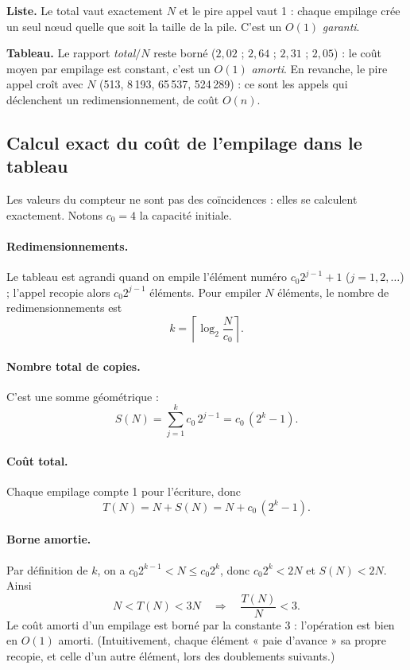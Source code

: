 \documentclass[11pt,a4paper]{article}
\begin{document}
\textbf{Liste.} Le total vaut exactement $N$ et le pire appel vaut 1 : chaque empilage crée un seul nœud quelle que soit la taille de la pile. C'est un $O(1)$ \emph{garanti}.

\textbf{Tableau.} Le rapport \emph{total}$/N$ reste borné ($2{,}02$ ; $2{,}64$ ; $2{,}31$ ; $2{,}05$) : le coût moyen par empilage est constant, c'est un $O(1)$ \emph{amorti}. En revanche, le pire appel croît avec $N$ (513, 8\,193, 65\,537, 524\,289) : ce sont les appels qui déclenchent un redimensionnement, de coût $O(n)$.

\subsection{Calcul exact du coût de l'empilage dans le tableau}\label{sec:calcul}

Les valeurs du compteur ne sont pas des coïncidences : elles se calculent exactement. Notons $c_0=4$ la capacité initiale.

\paragraph{Redimensionnements.} Le tableau est agrandi quand on empile l'élément numéro $c_0 2^{j-1}+1$ ($j=1,2,\dots$) ; l'appel recopie alors $c_0 2^{j-1}$ éléments. Pour empiler $N$ éléments, le nombre de redimensionnements est
\[
k=\left\lceil \log_2\frac{N}{c_0}\right\rceil .
\]

\paragraph{Nombre total de copies.} C'est une somme géométrique :
\[
S(N)=\sum_{j=1}^{k} c_0\,2^{j-1}=c_0\,(2^{k}-1).
\]

\paragraph{Coût total.} Chaque empilage compte 1 pour l'écriture, donc
\[
T(N)=N+S(N)=N+c_0\,(2^{k}-1).
\]

\paragraph{Borne amortie.} Par définition de $k$, on a $c_0 2^{k-1}<N\le c_0 2^{k}$, donc $c_0 2^{k}<2N$ et $S(N)<2N$. Ainsi
\[
N<T(N)<3N \quad\Longrightarrow\quad \frac{T(N)}{N}<3 .
\]
Le coût amorti d'un empilage est borné par la constante 3 : l'opération est bien en $O(1)$ amorti. (Intuitivement, chaque élément « paie d'avance » sa propre recopie, et celle d'un autre élément, lors des doublements suivants.)
\end{document}

